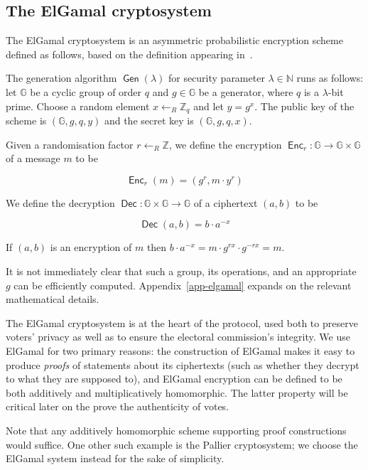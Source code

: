 \documentclass[12pt,a4paper]{article}
\DeclareMathOperator{\Gen}{\mathsf{Gen}}
\DeclareMathOperator{\Enc}{\mathsf{Enc}}
\DeclareMathOperator{\Dec}{\mathsf{Dec}}
\theoremstyle{definition}
\newcounter{protocol}
\begin{document}
\subsection{The ElGamal cryptosystem}
The ElGamal cryptosystem is an asymmetric probabilistic encryption scheme defined as follows, based on the definition appearing in~\cite{katz2014introduction}.
\begin{definition}\label{def-elgamal}
    The generation algorithm $\Gen(\lambda)$ for security parameter $\lambda\in\mathbb{N}$ runs as follows: let $\mathbb{G}$ be a cyclic group of order $q$ and $g\in\mathbb{G}$ be a generator, where $q$ is a $\lambda$-bit prime. Choose a random element $x\gets_R\mathbb{Z}_q$ and let $y=g^x$. The public key of the scheme is $(\mathbb{G}, g, q, y)$ and the secret key is $(\mathbb{G}, g, q, x)$.

    Given a randomisation factor $r\gets_R\mathbb{Z}$, we define the encryption $\Enc_r:\mathbb{G}\rightarrow\mathbb{G}\times\mathbb{G}$ of a message $m$ to be
    
    $$\Enc_r(m) = (g^r, m\cdot y^r)$$

    We define the decryption $\Dec:\mathbb{G}\times\mathbb{G}\rightarrow \mathbb{G}$ of a ciphertext $(a, b)$ to be
    
    $$\Dec(a, b)=b\cdot a^{-x}$$

    If $(a, b)$ is an encryption of $m$ then $b\cdot a^{-x}=m\cdot g^{rx}\cdot g^{-rx}=m$.
\end{definition}
It is not immediately clear that such a group, its operations, and an appropriate $g$ can be efficiently computed. Appendix~\ref{app-elgamal} expands on the relevant mathematical details.

The ElGamal cryptosystem is at the heart of the protocol, used both to preserve voters' privacy as well as to ensure the electoral commission's integrity. We use ElGamal for two primary reasons: the construction of ElGamal makes it easy to produce \textit{proofs} of statements about its ciphertexts (such as whether they decrypt to what they are supposed to), and ElGamal encryption can be defined to be both additively and multiplicatively homomorphic. The latter property will be critical later on the prove the authenticity of votes.

Note that any additively homomorphic scheme supporting proof constructions would suffice. One other such example is the Pallier cryptosystem; we choose the ElGamal system instead for the sake of simplicity.
\end{document}
